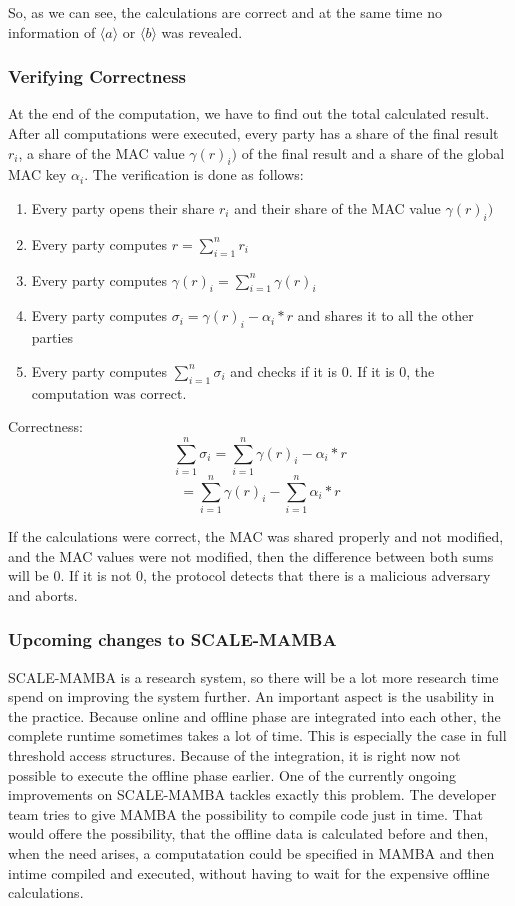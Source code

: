 \documentclass[english,runningheads,a4paper]{llncs}[2018/03/10]
\begin{document}
So, as we can see, the calculations are correct and at the same time no information of \(\langle a \rangle \) or \(\langle b \rangle \) was revealed.\\


\subsubsection{Verifying Correctness}
At the end of the computation, we have to find out the total calculated result. After all computations were executed, every party has a share of the final result \( r_i\), a share of the MAC value \( \gamma(r)_i)\) of the final result and a share of the global MAC key \( \alpha_i \). The verification is done as follows:

\begin{enumerate}
\item Every party  opens their share \( r_i\) and their share of the MAC value \( \gamma(r)_i) \)
\item Every party computes \( r = \sum_{i=1}^n r_i \) 
\item Every party computes  \( \gamma(r)_i = \sum_{i=1}^n \gamma(r)_i \)
\item Every party computes  \( \sigma_i =  \gamma(r)_i - \alpha_i * r\) and shares it to all the other parties
\item Every party computes \( \sum_{i=1}^n \sigma_i \) and checks if it is \(0\). If it is  \(0\), the computation was correct.
\end{enumerate}
Correctness: 
$$ \sum_{i=1}^n \sigma_i =  \sum_{i=1}^n  \gamma(r)_i - \alpha_i * r $$
$$=  \sum_{i=1}^n  \gamma(r)_i -  \sum_{i=1}^n  \alpha_i * r $$

If the calculations were correct, the MAC was shared properly and not modified, and the MAC values were not modified, then the difference between both sums will be 0. If it is not 0, the protocol detects that there is a malicious adversary and aborts.\\



\subsubsection{Upcoming changes to SCALE-MAMBA}
SCALE-MAMBA is a research system, so there will be a lot more research time spend on improving the system further. An important aspect is the usability in the practice. Because online and offline phase are integrated into each other, the complete runtime sometimes takes a lot of time. This is especially the case in full threshold access structures. Because of the integration, it is right now not possible to execute the offline phase earlier. One of the currently ongoing improvements on SCALE-MAMBA tackles exactly this problem. The developer team tries to give MAMBA the possibility to compile code just in time. That would offere the possibility, that the offline data is calculated before and then, when the need arises, a computatation could be specified in MAMBA and then intime compiled and executed, without having to wait for the expensive offline calculations.\\
\end{document}
